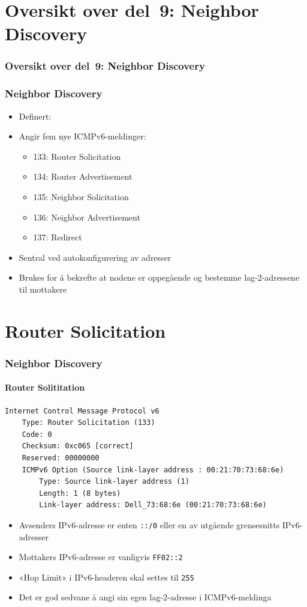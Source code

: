 \section*{Oversikt over del~9: Neighbor Discovery}
\begin{frame}[allowframebreaks]
  \frametitle{Oversikt over del~9: Neighbor Discovery}
  \tableofcontents%
\end{frame}

\begin{frame}%
  \frametitle{Neighbor Discovery}
  \begin{itemize}%
  \item Definert: 
  \item Angir fem nye ICMPv6-meldinger:
    \begin{itemize}%
    \item 133: Router Solicitation
    \item 134: Router Advertisement
    \item 135: Neighbor Solicitation
    \item 136: Neighbor Advertisement
    \item 137: Redirect
    \end{itemize}
  \item Sentral ved autokonfigurering av adresser
  \item Brukes for å bekrefte at nodene er oppegående og bestemme
    lag-2-adressene til mottakere
  \end{itemize}
\end{frame}

\section{Router Solicitation}
\begin{frame}[fragile]%
  \frametitle{Neighbor Discovery}
  \framesubtitle{Router Solititation}
\begin{Verbatim}[fontsize=\tiny]
Internet Control Message Protocol v6
    Type: Router Solicitation (133)
    Code: 0
    Checksum: 0xc065 [correct]
    Reserved: 00000000
    ICMPv6 Option (Source link-layer address : 00:21:70:73:68:6e)
        Type: Source link-layer address (1)
        Length: 1 (8 bytes)
        Link-layer address: Dell_73:68:6e (00:21:70:73:68:6e)
\end{Verbatim}
  \begin{itemize}%
  \item Avsenders IPv6-adresse er enten \texttt{::/0} eller en av
    utgående grensesnitts IPv6-adresser
  \item Mottakers IPv6-adresse er vanligvis \texttt{FF02::2}
  \item «Hop Limit» i IPv6-headeren skal settes til \texttt{255}
  \item Det er god sedvane å angi sin egen lag-2-adresse i ICMPv6-meldinga
  \end{itemize}
\end{frame}

